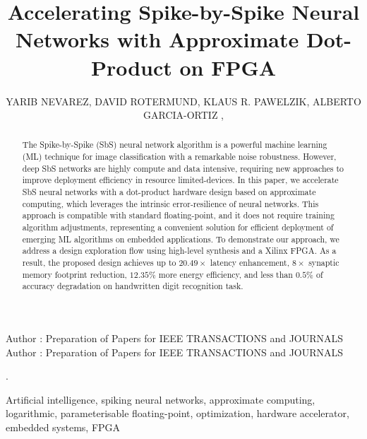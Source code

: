 \title {Accelerating Spike-by-Spike Neural Networks with Approximate Dot-Product on FPGA}

\author{
	\uppercase{Yarib Nevarez},	
	\uppercase{David Rotermund},
	\uppercase{Klaus R. Pawelzik},
	\uppercase{Alberto Garcia-Ortiz} ,
}

\address[1]{Institute of Electrodynamics and Microelectronics, University of Bremen, Bremen 28359, Germany (e-mail: nevarez@item.uni-bremen.de)}

\address[2]{Institute for Theoretical Physics, University of Bremen, Bremen 28359, Germany (e-mail: davrot@@neuro.uni-bremen.de)}

\address[3]{Institute for Theoretical Physics, University of Bremen, Bremen 28359, Germany (e-mail: pawelzik@@neuro.uni-bremen.de)}

\address[4]{Institute of Electrodynamics and Microelectronics, University of Bremen, Bremen 28359, Germany (e-mail: agaracia@item.uni-bremen.de)}


\markboth
{Author \headeretal: Preparation of Papers for IEEE TRANSACTIONS and JOURNALS}
{Author \headeretal: Preparation of Papers for IEEE TRANSACTIONS and JOURNALS}

.

\begin{abstract}
The Spike-by-Spike (SbS) neural network algorithm is a powerful machine learning (ML) technique for image classification with a remarkable noise robustness. However, deep SbS networks are highly compute and data intensive, requiring new approaches to improve deployment efficiency in resource limited-devices. In this paper, we accelerate SbS neural networks with a dot-product hardware design based on approximate computing, which leverages the intrinsic error-resilience of neural networks. This approach is compatible with standard floating-point, and it does not require training algorithm adjustments, representing a convenient solution for efficient deployment of emerging ML algorithms on embedded applications. To demonstrate our approach, we address a design exploration flow using high-level synthesis and a Xilinx FPGA. As a result, the proposed design achieves up to $20.49\times$ latency enhancement, $8\times$ synaptic memory footprint reduction, $12.35\%$ more energy efficiency, and less than $0.5\%$ of accuracy degradation on handwritten digit recognition task.
	
\end{abstract}

\begin{keywords}
Artificial intelligence, spiking neural networks, approximate computing, logarithmic, parameterisable floating-point, optimization, hardware accelerator, embedded systems, FPGA
\end{keywords}

\titlepgskip=-15pt

\maketitle

